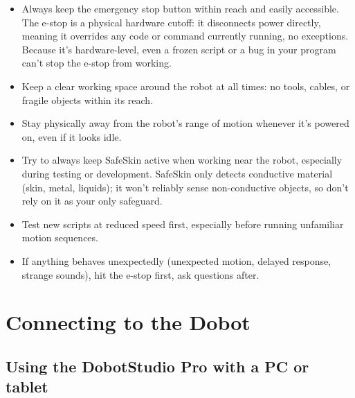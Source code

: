 \documentclass[11pt,a4paper]{article}
\begin{document}
\begin{itemize}[leftmargin=1.2cm]
    \item Always keep the emergency stop button within reach and easily accessible. The e-stop is a physical hardware cutoff: it disconnects power directly, meaning it overrides any code or command currently running, no exceptions. Because it's hardware-level, even a frozen script or a bug in your program can't stop the e-stop from working.
    \item Keep a clear working space around the robot at all times: no tools, cables, or fragile objects within its reach.
    \item Stay physically away from the robot's range of motion whenever it's powered on, even if it looks idle.
    \item Try to always keep SafeSkin active when working near the robot, especially during testing or development. SafeSkin only detects conductive material (skin, metal, liquids); it won't reliably sense non-conductive objects, so don't rely on it as your only safeguard.
    \item Test new scripts at reduced speed first, especially before running unfamiliar motion sequences.
    \item If anything behaves unexpectedly (unexpected motion, delayed response, strange sounds), hit the e-stop first, ask questions after.
\end{itemize}

\section{Connecting to the Dobot}
\label{sec:connecting}

\subsection{Using the DobotStudio Pro with a PC or tablet}
\label{sec:connecting-dobotstudio}
\end{document}
